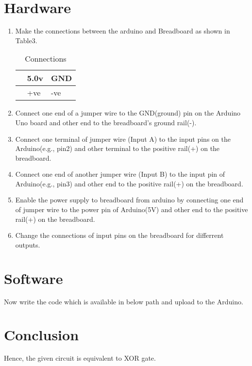 \documentclass[10pt,a4paper]{article}
\begin{document}
     \section{Hardware}
	     \begin{enumerate}
		     \item Make the connections between the arduino and Breadboard as shown in Table3.
			     \begin{table}[h]
				     \centering
				     \begin{tabularx}{0.5\textwidth}
					     {
						     | >{\centering\arraybackslash}X
						     | >{\centering\arraybackslash}X
						     | >{\centering\arraybackslash}X |}
						     \hline
						     {\bf Arduino} & 5.0v & GND \\
						     \hline
						     {\bf Breadboard} & +ve & -ve  \\
						     \hline
				     \end{tabularx}
				     \caption{\label{Table-3}Connections}
			     \end{table}
		\item Connect one end of a jumper wire to the GND(ground) pin on the Arduino Uno board and other end to the breadboard’s ground rail(-).
                \item Connect one terminal of jumper wire (Input A) to the input pins on the Arduino(e.g., pin2) and other terminal to the positive rail(+) on the breadboard.
		\item Connect one end of another jumper wire (Input B) to the input pin of Arduino(e.g., pin3) and other end to the positive rail(+) on the breadboard.
		\item Enable the power supply to breadboard from arduino by connecting one end of jumper wire to the power pin of Arduino(5V) and other end to the positive rail(+) on the breadboard.
		\item Change the connections of input pins on the breadboard for differrent outputs. 
	     \end{enumerate}
     \section{Software}
	     Now write the code which is available in below path and upload to the Arduino.\\
	     \section{Conclusion}
	     Hence, the given circuit is equivalent to XOR gate. 
\end{document}
